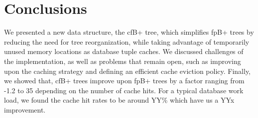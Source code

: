 \documentclass{article}
\begin{document}
\section{Conclusions}
We presented a new data structure, the cfB+ tree, which simplifies fpB+ trees by
reducing the need for tree reorganization,
while taking advantage of temporarily unused memory locations as database tuple
caches.
We discussed challenges of the implementation, as well as problems that remain
open,
such as improving upon the caching strategy and defining an efficient cache
eviction policy.
Finally, we showed that, cfB+ trees improve upon fpB+ trees by a factor ranging
from -1.2 to 35 depending on the number of cache hits. For a typical database
work load, we found the cache hit rates to be around YY\% which have us a YYx
improvement.

\small



\end{document}
